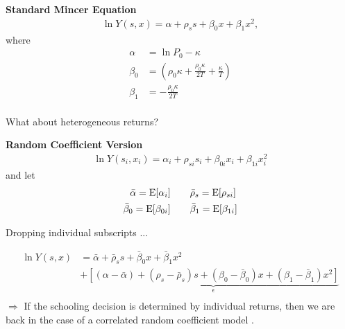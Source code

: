 \begin{frame}
\textbf{Standard Mincer Equation}
\begin{align*}
\ln Y(s, x) = \alpha + \rho_s s + \beta_0 x + \beta_1 x^2,
\end{align*}
where
\begin{align*}
\alpha & =\ln{P_0} - \kappa \\
\beta_0 & = \left(\rho_0\kappa + \frac{\rho_0\kappa}{2T} + \frac{\kappa}{T}\right) \\
\beta_1 & = -\frac{\rho_0\kappa}{2T}\\
\end{align*}

What about heterogeneous returns?

\end{frame}
\begin{frame}
\textbf{Random Coefficient Version}
\begin{align*}
\ln{Y(s_i, x_i)} = \alpha_{i} + \rho_{si} s_i + \beta_{0i} x_i + \beta_{1i} x_i^2
\end{align*}
and let
\begin{align*}
\bar{\alpha} = \mathrm{E}[\alpha_i] &\qquad \bar{\rho}_s = \mathrm{E}[\rho_{si}]\\
\bar{\beta}_0 = \mathrm{E}[\beta_{0i}]&\qquad \bar{\beta}_1 = \mathrm{E}[\beta_{1i}]
\end{align*}
\end{frame}
\begin{frame}
Dropping individual subscripts ...

\begin{align*}
\ln{Y(s, x)} & = \bar{\alpha} + \bar{\rho}_s s + \bar{\beta}_{0} x + \bar{\beta}_{1} x^2 \\
                & + \underbrace{[(\alpha - \bar{\alpha}) + (\rho_s - \bar{\rho}_s) s + (\beta_0 - \bar{\beta}_0)x + (\beta_1 - \bar{\beta}_1)x^2 ]}_{\epsilon}\\
\end{align*}
$\Rightarrow$ If the schooling decision is determined by individual returns, then we are back in the case of a correlated random coefficient model \cite{Heckman.2006d}.
\end{frame}
